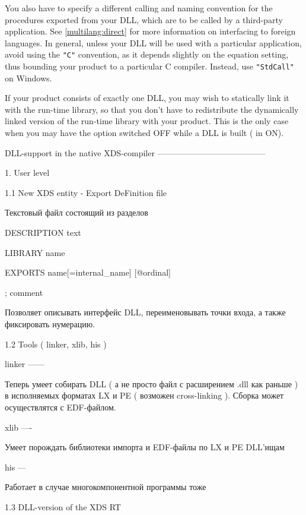 You also have to specify a different calling and naming convention for the procedures
exported from your DLL, which are to be called by a third-party application.
See \ref{multilang:direct} for more information on interfacing to foreign languages.
In general, unless your DLL will be used with a particular application,
avoid using the \verb'"C"' convention, as it depends slightly on the  equation
setting, thus bounding your product to a particular C compiler.
Instead, use \verb'"StdCall"' on Windows.

If your product consists of exactly one DLL, you may wish to statically
link it with the \XDS{} run-time library, so that you don't have to redistribute
the dynamically linked version of the run-time library with your product.
This is the only case when you may have the  option switched OFF
while a DLL is built ( in ON).

\ifcomment
              DLL-support in the native XDS-compiler
              ---------------------------------------

    1. User level

      1.1 New XDS entity - Export DeFinition file

          Текстовый файл состоящий из разделов

             DESCRIPTION text

             LIBRARY     name

             EXPORTS     name[=internal_name] [@ordinal]

             ; comment

          Позволяет описывать интерфейс DLL, переименовывать точки входа, а также
          фиксировать нумерацию.

      1.2 Tools ( linker, xlib, his )

          linker
          ------

          Теперь умеет собирать DLL ( а не просто файл с расширением .dll как раньше )
          в исполняемых форматах LX и PE ( возможен cross-linking ). Сборка может
          осуществлятся с EDF-файлом.

          xlib
          ----

          Умеет порождать библиотеки импорта и EDF-файлы по LX и PE DLL'ищам

          his
          ---

          Работает в случае многокомпонентной программы тоже


      1.3 DLL-version of the XDS RT

